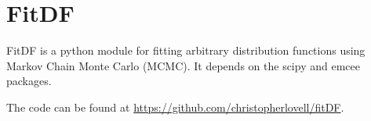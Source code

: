 \section{FitDF}
\textsf{FitDF} is a python module for fitting arbitrary distribution functions using Markov Chain Monte Carlo (MCMC).
It depends on the \textsf{scipy} and \textsf{emcee} packages.

The code can be found at \href{https://github.com/christopherlovell/fitDF}{https://github.com/christopherlovell/fitDF}.
